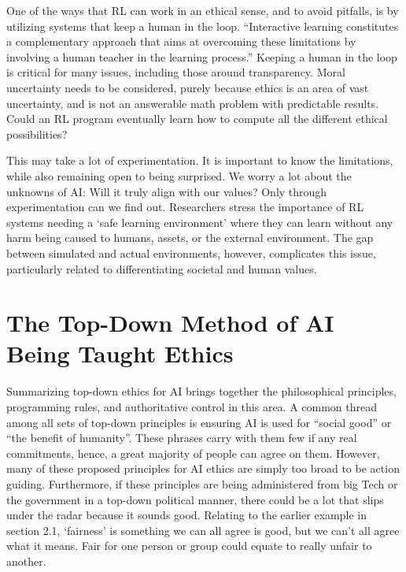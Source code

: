 \documentclass{svproc}
\begin{document}
One of the ways that RL can work in an ethical sense, and to avoid pitfalls, is by utilizing systems that keep a human in the loop. “Interactive learning constitutes a complementary approach that aims at overcoming these limitations by involving a human teacher in the learning process.” \cite{Najar2021ReinforcementSurvey} Keeping a human in the loop is critical for many issues, including those around transparency. Moral uncertainty needs to be considered, purely because ethics is an area of vast uncertainty, and is not an answerable math problem with predictable results. \cite{Ecoffet2020ReinforcementUncertainty} Could an RL program eventually learn how to compute all the different ethical possibilities? 

This may take a lot of experimentation. It is important to know the limitations, while also remaining open to being surprised. We worry a lot about the unknowns of AI: Will it truly align with our values? Only through experimentation can we find out. Researchers stress the importance of RL systems needing a ‘safe learning environment’ where they can learn without any harm being caused to humans, assets, or the external environment. The gap between simulated and actual environments, however, complicates this issue, particularly related to differentiating societal and human values. \cite{Bragg2018WhatLearning}

\section{The Top-Down Method of AI Being Taught Ethics}

Summarizing top-down ethics for AI brings together the philosophical principles, programming rules, and authoritative control in this area. A common thread among all sets of top-down principles is ensuring AI is used for “social good” or “the benefit of humanity”. These phrases carry with them few if any real commitments, hence, a great majority of people can agree on them. However, many of these proposed principles for AI ethics are simply too broad to be action guiding. \cite{Whittlestone2019TheEthics}  Furthermore, if these principles are being administered from big Tech or the government in a top-down political manner, there could be a lot that slips under the radar because it sounds good. Relating to the earlier example in section 2.1, ‘fairness’ is something we can all agree is good, but we can’t all agree what it means. Fair for one person or group could equate to really unfair to another. 
\end{document}
